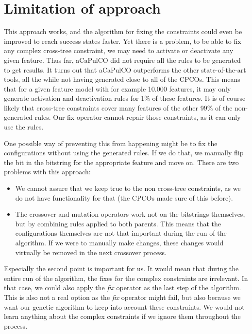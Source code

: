 \section{Limitation of approach}
This approach works, and the algorithm for fixing the constraints could even be
improved to reach success states faster. Yet there is a problem, to be able to
fix any complex cross-tree constraint, we may need to activate or deactivate any
given feature. Thus far, aCaPulCO did not require all the rules to be generated
to get results. It turns out that aCaPulCO outperforms the other
state-of-the-art tools, all the while not having generated close to all of the
CPCOs. This means that for a given feature model with for example 10.000 features,
it may only generate activation and deactivation rules for 1\% of these features.
It is of course likely that cross-tree constraints cover many features of the other
99\% of the non-generated rules. Our fix operator cannot repair those constraints,
as it can only use the rules.

One possible way of preventing this from happening might be to fix the
configurations without using the generated rules. If we do that, we manually flip
the bit in the bitstring for the appropriate feature and move on. There are two
problems with this approach:
\begin{itemize}
    \item We cannot assure that we keep true to the non cross-tree constraints, as
          we do not have functionality for that (the CPCOs made sure of this before).
    \item The crossover and mutation operators work not on the bitstrings themselves,
          but by combining rules applied to both parents. This means that the
          configurations themselves are not that important during the run of the
          algorithm. If we were to manually make changes, these changes would virtually
          be removed in the next crossover process.
\end{itemize}

Especially the second point is important for us. It would mean that during the entire
run of the algorithm, the fixes for the complex constraints are irrelevant. In that
case, we could also apply the \emph{fix} operator as the last step of the algorithm.
This is also not a real option as the \emph{fix} operator might fail, but also
because we want our genetic algorithm to keep into account these constraints. We
would not learn anything about the complex constraints if we ignore them throughout
the process.
